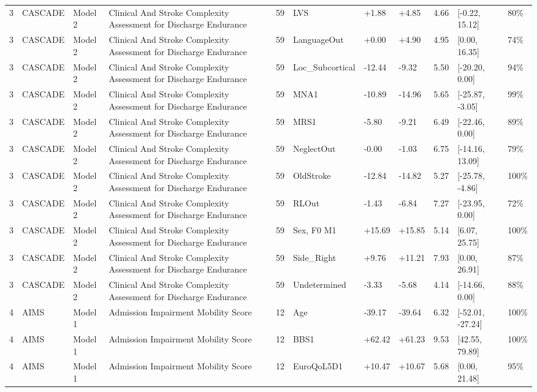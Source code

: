\begin{tabular}{lllllllllll}
3 & CASCADE & Model 2 & Clinical And Stroke Complexity Assessment for Discharge Endurance & 59 & LVS & +1.88 & +4.85 & 4.66 & [-0.22, 15.12] & 80\% \\
3 & CASCADE & Model 2 & Clinical And Stroke Complexity Assessment for Discharge Endurance & 59 & LanguageOut & +0.00 & +4.90 & 4.95 & [0.00, 16.35] & 74\% \\
3 & CASCADE & Model 2 & Clinical And Stroke Complexity Assessment for Discharge Endurance & 59 & Loc\_Subcortical & -12.44 & -9.32 & 5.50 & [-20.20, 0.00] & 94\% \\
3 & CASCADE & Model 2 & Clinical And Stroke Complexity Assessment for Discharge Endurance & 59 & MNA1 & -10.89 & -14.96 & 5.65 & [-25.87, -3.05] & 99\% \\
3 & CASCADE & Model 2 & Clinical And Stroke Complexity Assessment for Discharge Endurance & 59 & MRS1 & -5.80 & -9.21 & 6.49 & [-22.46, 0.00] & 89\% \\
3 & CASCADE & Model 2 & Clinical And Stroke Complexity Assessment for Discharge Endurance & 59 & NeglectOut & -0.00 & -1.03 & 6.75 & [-14.16, 13.09] & 79\% \\
3 & CASCADE & Model 2 & Clinical And Stroke Complexity Assessment for Discharge Endurance & 59 & OldStroke & -12.84 & -14.82 & 5.27 & [-25.78, -4.86] & 100\% \\
3 & CASCADE & Model 2 & Clinical And Stroke Complexity Assessment for Discharge Endurance & 59 & RLOut & -1.43 & -6.84 & 7.27 & [-23.95, 0.00] & 72\% \\
3 & CASCADE & Model 2 & Clinical And Stroke Complexity Assessment for Discharge Endurance & 59 & Sex, F0 M1 & +15.69 & +15.85 & 5.14 & [6.07, 25.75] & 100\% \\
3 & CASCADE & Model 2 & Clinical And Stroke Complexity Assessment for Discharge Endurance & 59 & Side\_Right & +9.76 & +11.21 & 7.93 & [0.00, 26.91] & 87\% \\
3 & CASCADE & Model 2 & Clinical And Stroke Complexity Assessment for Discharge Endurance & 59 & Undetermined & -3.33 & -5.68 & 4.14 & [-14.66, 0.00] & 88\% \\
4 & AIMS & Model 1 & Admission Impairment Mobility Score & 12 & Age & -39.17 & -39.64 & 6.32 & [-52.01, -27.24] & 100\% \\
4 & AIMS & Model 1 & Admission Impairment Mobility Score & 12 & BBS1 & +62.42 & +61.23 & 9.53 & [42.55, 79.89] & 100\% \\
4 & AIMS & Model 1 & Admission Impairment Mobility Score & 12 & EuroQoL5D1 & +10.47 & +10.67 & 5.68 & [0.00, 21.48] & 95\% \\

\end{tabular}

